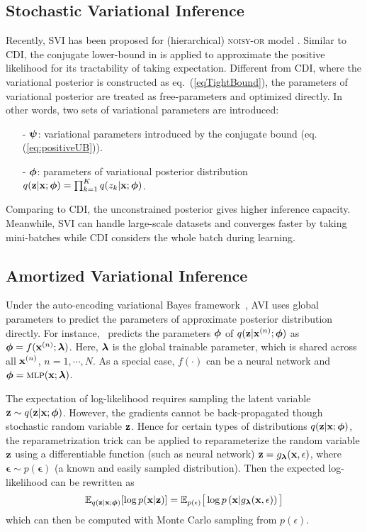 \subsection{Stochastic Variational Inference}
Recently, SVI has been proposed for (hierarchical) \textsc{noisy-or} model \citep{jivariational}. Similar to CDI, the conjugate lower-bound in \citep{jaakkola1999variational, vsingliar2006noisy} is applied to approximate the positive likelihood for its tractability of taking expectation. 
Different from CDI, where the variational posterior is constructed as eq.~(\ref{eqTightBound}), the parameters of variational posterior are treated as free-parameters and optimized directly. In other words, two sets of variational parameters are introduced:
\begin{itemize}
\setlength\itemsep{0em}
    \item[-] $\bm{\psi}$: variational parameters introduced by the conjugate bound (eq. (\ref{eq:positiveUB})).
    \item[-] $\bm{\phi}$: parameters of variational posterior distribution $q(\mathbf{z}|\mathbf{x}; \bm{\phi}) = \prod_{k=1}^K q(z_k|\mathbf{x}; \bm{\phi})$.
\end{itemize}
Comparing to CDI, the unconstrained posterior gives higher inference capacity. 
Meanwhile, SVI can handle large-scale datasets and converges faster by taking mini-batches while CDI considers the whole batch during learning. 


\subsection{Amortized Variational Inference}
\label{sec: avi}
Under the auto-encoding variational Bayes framework~\citep{kingma2013auto}, AVI uses global parameters to predict the parameters of approximate posterior distribution directly. 
For instance,~\citep{kingma2013auto} predicts the parameters $\bm{\phi}$ of $q(\mathbf{z}|\mathbf{x}^{(n)}; {\bm{\phi}})$ as $\bm{\phi} = f(\mathbf{x}^{(n)}; \bm{\lambda})$. Here, $\bm{\lambda}$ is the global trainable parameter, which is shared across all $\mathbf{x}^{(n)}$, $n=1, \cdots, N$. As a special case, $f(\cdot)$ can be a neural network and $\bm{\phi} = \textsc{mlp}(\mathbf{x}; \bm{\lambda})$. 

The expectation of log-likelihood requires sampling the latent variable $\mathbf{z} \sim q(\mathbf{z}|\mathbf{x}; \bm{\phi})$. However, the gradients cannot be back-propagated though stochastic random variable $\mathbf{z}$. Hence for certain types of distributions $q(\mathbf{z}|\mathbf{x}; \bm{\phi})$, the reparametrization trick can be applied to reparameterize the random variable $\mathbf{z}$ using a differentiable function (such as neural network) $\mathbf{z}=g_{\bm{\lambda}}(\mathbf{x}, \mathbf{\epsilon})$, where $\mathbf{\epsilon}\sim p(\mathbf{\epsilon})$ (a known and easily sampled distribution). Then the expected log-likelihood can be rewritten as
\begin{align}
    \mathbb{E}_{q(\mathbf{z}|\mathbf{x}; \bm{\phi})}[\log p(\mathbf{x}|\mathbf{z})] = \mathbb{E}_{p(\mathbf{\epsilon})}\big[\log p \left(\mathbf{x}| g_{\bm{\lambda}}(\mathbf{x}, \mathbf{\epsilon})\right)\big]
\end{align}
which can then be computed with Monte Carlo sampling from $p(\epsilon)$.

